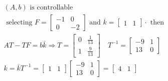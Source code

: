 \documentclass{article}
\begin{document}
$$
\begin{aligned}
&(A, b) \text { is controllable }\\
&\text { selecting } F=\left[\begin{array}{cc}
-1 & 0 \\
0 & -2
\end{array}\right] \text { and } \overline{k}=\left[\begin{array}{cc}
1 & 1
\end{array}\right] \cdot \text { then }\\
&A T-T F=b \bar{k} \Rightarrow T=\left[\begin{array}{cc}
0 & \frac{1}{13} \\
1 & \frac{9}{13}
\end{array}\right] \quad T^{-1}=\left[\begin{array}{cc}
-9 & 1 \\
13 & 0
\end{array}\right]\\
&k=\overline{k} T^{-1}=\left[\begin{array}{ll}
1 & 1
\end{array}\right]\left[\begin{array}{cc}
-9 & 1 \\
13 & 0
\end{array}\right]=\left[\begin{array}{ll}
4 & 1
\end{array}\right]
\end{aligned}
$$
\end{document}
